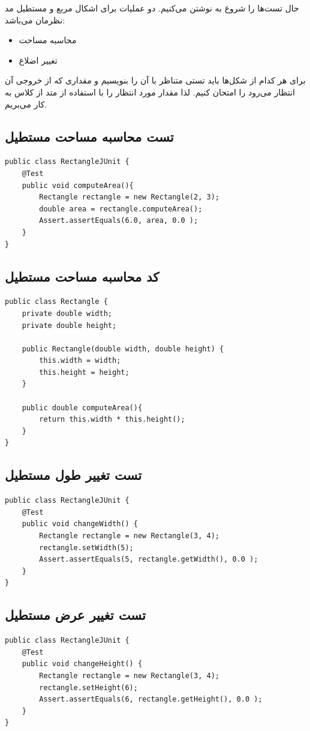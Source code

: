 حال تست‌ها را شروع به نوشتن می‌کنیم. دو عملیات برای اشکال مربع و مستطیل مد نظرمان می‌باشد: 
\begin{itemize}
	\item محاسبه مساحت
	\item تغییر اضلاع
\end{itemize}

برای هر کدام از شکل‌ها باید تستی متناظر با آن را بنویسیم و مقداری که از خروجی آن انتظار می‌رود را امتحان کنیم. لذا مقدار مورد انتظار را با استفاده از متد  از کلاس  به کار می‌بریم. 

\subsection*{تست محاسبه مساحت مستطیل}
\begin{Verbatim}[tabsize=4]
public class RectangleJUnit {
	@Test
	public void computeArea(){
		Rectangle rectangle = new Rectangle(2, 3);
		double area = rectangle.computeArea();
		Assert.assertEquals(6.0, area, 0.0 );
	}
}
\end{Verbatim}

\subsection*{کد محاسبه مساحت مستطیل}
\begin{Verbatim}[tabsize=4]
public class Rectangle {
	private double width;
	private double height;

	public Rectangle(double width, double height) {
		this.width = width;
		this.height = height;
	}
	
	public double computeArea(){
		return this.width * this.height();
	}
}
\end{Verbatim}

\subsection*{تست تغییر طول مستطیل}
\begin{Verbatim}[tabsize=4]
public class RectangleJUnit {
	@Test
	public void changeWidth() {
		Rectangle rectangle = new Rectangle(3, 4);
		rectangle.setWidth(5);
		Assert.assertEquals(5, rectangle.getWidth(), 0.0 );
	}
}
\end{Verbatim}


\subsection*{تست تغییر عرض مستطیل}
\begin{Verbatim}[tabsize=4]
public class RectangleJUnit {
	@Test
	public void changeHeight() {
		Rectangle rectangle = new Rectangle(3, 4);
		rectangle.setHeight(6);
		Assert.assertEquals(6, rectangle.getHeight(), 0.0 );
	}
}
\end{Verbatim}


